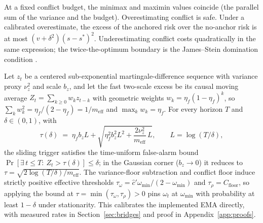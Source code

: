 \documentclass[twoside,11pt]{article}
\begin{document}
\begin{proposition}
\label{prop:minimax}
At a fixed conflict budget, the minimax and maximin values coincide (the parallel sum of the variance and the budget).
Overestimating conflict is safe.
Under a calibrated overestimate, the excess of the anchored risk over the no-anchor risk is at most $(v+\delta^2)(s-s^*)^2$. Underestimating conflict costs quadratically in the same expression; the twice-the-optimum boundary is the James--Stein domination condition \citep{james1961}.
\end{proposition}

\begin{proposition}
\label{prop:falsealarm}
Let $z_t$ be a centered sub-exponential martingale-difference sequence with variance proxy $\nu_z^2$ and scale $b_z$, and let the fast two-scale excess be its causal moving average $Z_t = \sum_{k\ge 0} w_k z_{t-k}$ with geometric weights $w_k = \eta_f(1-\eta_f)^k$, so $\sum_k w_k^2 = \eta_f/(2-\eta_f) = 1/m_{\mathrm{eff}}$ and $\max_k w_k = \eta_f$.
For every horizon $T$ and $\delta \in (0,1)$, with
\[
\tau(\delta) \;=\; \eta_f b_z L + \sqrt{\eta_f^2 b_z^2 L^2 + \frac{2\nu_z^2}{m_{\mathrm{eff}}}\,L},
\qquad L = \log(T/\delta),
\]
the sliding trigger satisfies the time-uniform false-alarm bound $\Pr[\exists\, t \le T:\ Z_t > \tau(\delta)] \le \delta$; in the Gaussian corner ($b_z \to 0$) it reduces to $\tau = \sqrt{2\log(T/\delta)/m_{\mathrm{eff}}}$.
The variance-floor subtraction and conflict floor induce strictly positive effective thresholds $\tau_\omega = \hat c' \omega_{\min}/(2-\omega_{\min})$ and $\tau_\rho = C_{\mathrm{floor}}$, so applying the bound at $\tau = \min(\tau_\omega,\tau_\rho) > 0$ pins $\omega_t$ at $\omega_{\min}$ with probability at least $1-\delta$ under stationarity.
This calibrates the implemented EMA directly, with measured rates in Section~\ref{sec:bridges} and proof in Appendix~\ref{app:proofs}.
\end{proposition}
\end{document}
